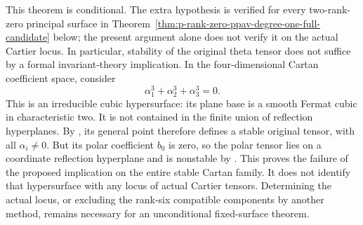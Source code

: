 \begin{remark}
\label{rem:nonordinary-polar-stability-gap-candidate}
This theorem is conditional. The extra hypothesis is verified for every
two-rank-zero principal surface in
Theorem~\ref{thm:p-rank-zero-ppav-degree-one-full-candidate} below;
the present argument alone does not verify it on the actual Cartier locus. In particular, stability of the original theta tensor does
not suffice by a formal invariant-theory implication.
In the four-dimensional Cartan coefficient space, consider
\[
                    \alpha_1^3+\alpha_2^3+\alpha_3^3=0.
\]
This is an irreducible cubic hypersurface: its plane base is a smooth
Fermat cubic in characteristic two. It is not contained in the finite
union of reflection hyperplanes. By
\citet[Proposition~2.10]{RainsSam2018Trivectors}, its general point
therefore defines a stable original tensor, with all $\alpha_i\ne0$.
But its polar coefficient $b_0$ is zero, so the polar tensor lies on
a coordinate reflection hyperplane and is nonstable by
\citet[Proposition~2.9]{RainsSam2018Trivectors}.
This proves the failure of the proposed implication on the entire
stable Cartan family. It does not identify that hypersurface with
any locus of actual Cartier tensors. Determining the actual locus,
or excluding the rank-six compatible components by another method,
remains necessary for an unconditional fixed-surface theorem.
\end{remark}
